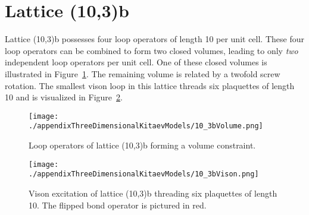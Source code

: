\pagebreak
%
%
\section{Lattice (10,3)b}
\label{appendix:ThreeDimensionalKitaevModels_10_3b}
%
%
Lattice (10,3)b possesses four loop operators of length 10 per unit cell.
These four loop operators can be combined to form two closed volumes, leading to only \textit{two} independent loop operators per unit cell.
One of these closed volumes is illustrated in Figure~\ref{fig:appendix_10_3bVolume}.
The remaining volume is related by a twofold screw rotation.
The smallest vison loop in this lattice threads six plaquettes of length 10 and is visualized in Figure~\ref{fig:appendix_10_3bVison}.
%
\begin{figure}[ht!]
	\centering
	\texttt{[image: ./appendixThreeDimensionalKitaevModels/10\_3bVolume.png]}
	\caption{
		Loop operators of lattice (10,3)b forming a volume constraint.
	}
	\label{fig:appendix_10_3bVolume}
\end{figure}
%
%
\begin{figure}[ht!]
	\centering
	\texttt{[image: ./appendixThreeDimensionalKitaevModels/10\_3bVison.png]}
	\caption{
		Vison excitation of lattice (10,3)b threading six plaquettes of length 10.
		The flipped bond operator is pictured in red.
	}
	\label{fig:appendix_10_3bVison}
\end{figure}
%


\pagebreak
%
%
